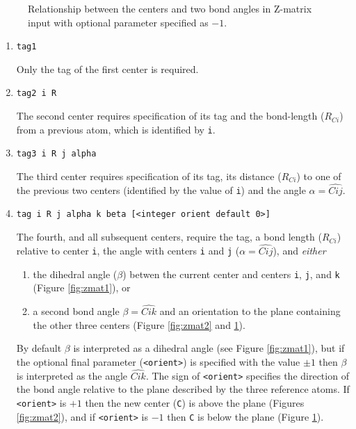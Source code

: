 \begin{figure}[htbp]
\centering
{}

\caption{\label{fig:zmat3} Relationship between the centers and two
  bond angles in Z-matrix input with optional parameter specified as $-1$.}
\end{figure}

\begin{enumerate}

   \item \verb+tag1+

   Only  the  tag  of the first center is required.

   \item \verb+tag2 i R+

     The second center requires specification of its tag and the
     bond-length ($R_{Ci}$) from a previous atom, which is identified by
     \verb+i+.

   \item \verb+tag3 i R j alpha+

     The third center requires specification of its tag, its distance
     ($R_{Ci}$) to one of the previous two centers (identified by the
     value of \verb+i+) and the angle $\alpha = \widehat{Cij}$.

   \item \verb+tag i R j alpha k beta [<integer orient default 0>]+

     The fourth, and all subsequent centers, require the tag, a bond
     length ($R_{Ci}$) relative to center \verb+i+, the angle with
     centers \verb+i+ and \verb+j+ ($\alpha = \widehat{Cij}$), and {\em either} 
    \begin{enumerate}
    \item the dihedral angle ($\beta$) betwen the current center and centers
      \verb+i+, \verb+j+, and \verb+k+ (Figure \ref{fig:zmat1}), or
      \item  a second bond angle $\beta = \widehat{Cik}$ and an orientation to 
      the plane containing the other three centers (Figure
      \ref{fig:zmat2} and \ref{fig:zmat3}).
    \end{enumerate}

    By default $\beta$ is interpreted as a dihedral angle (see Figure
    \ref{fig:zmat1}), but if the optional final parameter (\verb+<orient>+) is
    specified with the value $\pm 1$ then $\beta$ is interpreted as
    the angle $\widehat{Cik}$.  The sign of \verb+<orient>+ specifies the
    direction of the bond angle relative to the plane described by the
    three reference atoms.  If \verb+<orient>+ is $+1$ then the new center
    (\verb+C+) is above the plane (Figures \ref{fig:zmat2}), and if
    \verb+<orient>+ is $-1$ then \verb+C+ is below the plane (Figure
    \ref{fig:zmat3}).
\end{enumerate}

